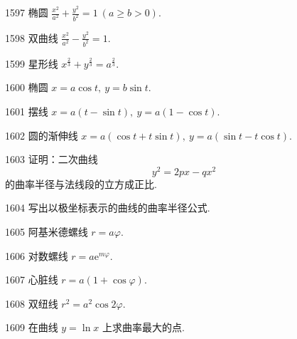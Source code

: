 \begin{prob}[S]{1597}
椭圆 $\frac{x^2}{a^2} + \frac{y^2}{b^2} = 1 \ (a \geqslant b > 0)$.
\end{prob}

\begin{prob}[S]{1598}
双曲线 $\frac{x^2}{a^2} - \frac{y^2}{b^2} = 1$.
\end{prob}

\begin{prob}[S]{1599}
星形线 $x^{\frac{2}{3}} + y^{\frac{2}{3}} = a^{\frac{2}{3}}$.
\end{prob}

\begin{prob}[S]{1600}
椭圆 $x = a\cos t,\ y = b\sin t$.
\end{prob}

\begin{prob}[S]{1601}
摆线 $x = a(t - \sin t),\ y = a(1 - \cos t)$.
\end{prob}

\begin{prob}[S]{1602}
圆的渐伸线 $x = a(\cos t + t\sin t),\ y = a(\sin t - t\cos t)$.
\end{prob}

\begin{prob}[M]{1603}
证明：二次曲线
\[
y^2 = 2px - qx^2
\]
的曲率半径与法线段的立方成正比.
\end{prob}

\begin{prob}[S]{1604}
写出以极坐标表示的曲线的曲率半径公式.
\end{prob}


\begin{prob}[S]{1605}
阿基米德螺线 $r = a\varphi$.
\end{prob}

\begin{prob}[S]{1606}
对数螺线 $r = a\mathrm{e}^{m\varphi}$.
\end{prob}

\begin{prob}[S]{1607}
心脏线 $r = a(1 + \cos\varphi)$.
\end{prob}

\begin{prob}[S]{1608}
双纽线 $r^2 = a^2 \cos 2\varphi$.
\end{prob}

\begin{prob}[M]{1609}
在曲线 $y = \ln x$ 上求曲率最大的点.
\end{prob}

